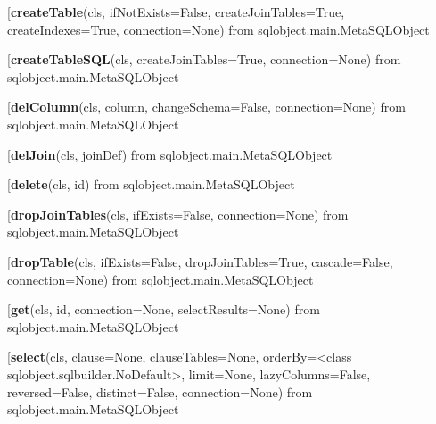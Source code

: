 \begin{description}\item[{\bf createTable}(cls, ifNotExists=False, createJoinTables=True, createIndexes=True, connection=None) from sqlobject.main.MetaSQLObject\end{description}

\begin{description}\item[{\bf createTableSQL}(cls, createJoinTables=True, connection=None) from sqlobject.main.MetaSQLObject\end{description}

\begin{description}\item[{\bf delColumn}(cls, column, changeSchema=False, connection=None) from sqlobject.main.MetaSQLObject\end{description}

\begin{description}\item[{\bf delJoin}(cls, joinDef) from sqlobject.main.MetaSQLObject\end{description}

\begin{description}\item[{\bf delete}(cls, id) from sqlobject.main.MetaSQLObject\end{description}

\begin{description}\item[{\bf dropJoinTables}(cls, ifExists=False, connection=None) from sqlobject.main.MetaSQLObject\end{description}

\begin{description}\item[{\bf dropTable}(cls, ifExists=False, dropJoinTables=True, cascade=False, connection=None) from sqlobject.main.MetaSQLObject\end{description}

\begin{description}\item[{\bf get}(cls, id, connection=None, selectResults=None) from sqlobject.main.MetaSQLObject\end{description}

\begin{description}\item[{\bf select}(cls, clause=None, clauseTables=None, orderBy=<class sqlobject.sqlbuilder.NoDefault>, limit=None, lazyColumns=False, reversed=False, distinct=False, connection=None) from sqlobject.main.MetaSQLObject\end{description}

